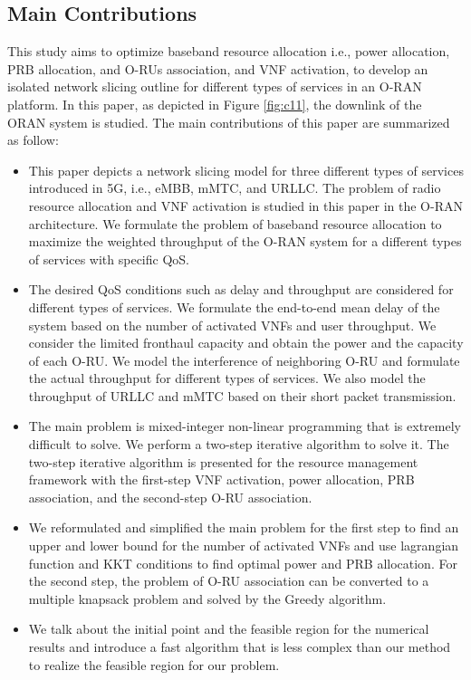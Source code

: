 \documentclass[conference]{IEEEtran}
\begin{document}
\subsection{Main Contributions}
This study aims to optimize baseband resource allocation i.e., power allocation, PRB allocation, and O-RUs association, and VNF activation, to develop an isolated network slicing outline for different types of services in an O-RAN platform. In this paper, as depicted in Figure \ref{fig:c11}, the downlink of the ORAN system is studied. The main contributions of this paper are summarized as follow:
\begin{itemize}
\item This paper depicts a network slicing model for three different types of services introduced in 5G, i.e., eMBB, mMTC, and URLLC. The problem of radio resource allocation and VNF activation is studied in this paper in the O-RAN architecture.
We formulate the problem of baseband resource allocation to maximize the weighted throughput of the O-RAN system for a different types of services with specific QoS. 
\item The desired QoS conditions such as delay and throughput are considered for different types of services. We formulate the end-to-end mean delay of the system based on the number of activated VNFs and  user throughput.
We consider the limited fronthaul capacity and obtain the power and the capacity of each O-RU. We model the interference of neighboring O-RU and formulate the actual throughput
for different types of services. We also model the throughput of URLLC and mMTC based on their short packet transmission.
\item The main problem is mixed-integer non-linear programming that is extremely difficult to solve.
We perform a two-step iterative algorithm to solve it.
The two-step iterative algorithm is presented for the resource management framework with the first-step VNF activation, power allocation, PRB association, and the second-step O-RU association.
\item We reformulated and simplified the main problem for the first step to find an upper and lower bound for the number of activated VNFs and use lagrangian function and KKT conditions to find optimal power and PRB allocation.
For the second step, the problem of O-RU association can be converted to a multiple knapsack problem and solved by the Greedy algorithm.
\item We talk about the initial point and the feasible region for the numerical results and introduce a fast algorithm that is less complex than our method to realize the feasible region for our problem.
\end{itemize}  
\end{document}
